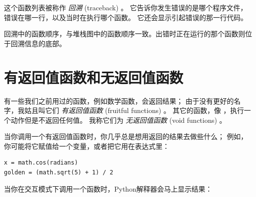 这个函数列表被称作 {\em 回溯} (traceback) 。
它告诉你发生错误的是哪个程序文件，错误在哪一行，以及当时在执行哪个函数。
它还会显示引起错误的那一行代码。


回溯中的函数顺序，与堆栈图中的函数顺序一致。出错时正在运行的那个函数则位于回溯信息的底部。


%
\section{有返回值函数和无返回值函数}
  
  
  
  



有一些我们之前用过的函数，例如数学函数，会返回结果；
由于没有更好的名字，我姑且叫它们 {\em 有返回值函数} (fruitful functions) 。
其它的函数，像  ，执行一个动作但是不返回任何值。
我称它们为 {\em 无返回值函数} (void functions) 。


当你调用一个有返回值函数时，你几乎总是想用返回的结果去做些什么；
例如，你可能将它赋值给一个变量，或者把它用在表达式里：

\begin{lstlisting}
x = math.cos(radians)
golden = (math.sqrt(5) + 1) / 2
\end{lstlisting}

%

当你在交互模式下调用一个函数时，Python解释器会马上显示结果：

